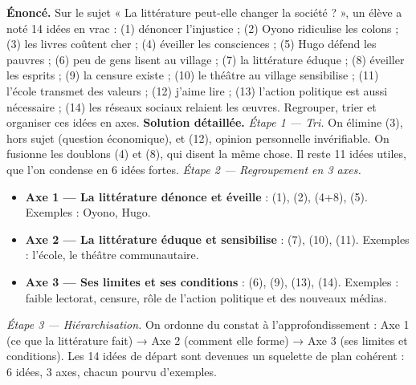 \documentclass[11pt]{article}
\begin{document}
\begin{exoresolu}
\textbf{Énoncé.} Sur le sujet « La littérature peut-elle changer la société ? », un élève a noté 14 idées en vrac : (1) dénoncer l'injustice ; (2) Oyono ridiculise les colons ; (3) les livres coûtent cher ; (4) éveiller les consciences ; (5) Hugo défend les pauvres ; (6) peu de gens lisent au village ; (7) la littérature éduque ; (8) éveiller les esprits ; (9) la censure existe ; (10) le théâtre au village sensibilise ; (11) l'école transmet des valeurs ; (12) j'aime lire ; (13) l'action politique est aussi nécessaire ; (14) les réseaux sociaux relaient les œuvres. Regrouper, trier et organiser ces idées en axes.
\tcblower
\textbf{Solution détaillée.}
\emph{Étape 1 — Tri.} On élimine (3), hors sujet (question économique), et (12), opinion personnelle invérifiable. On fusionne les doublons (4) et (8), qui disent la même chose. Il reste 11 idées utiles, que l'on condense en 6 idées fortes.
\emph{Étape 2 — Regroupement en 3 axes.}
\begin{itemize}
\item \textbf{Axe 1 — La littérature dénonce et éveille} : (1), (2), (4+8), (5). Exemples : Oyono, Hugo.
\item \textbf{Axe 2 — La littérature éduque et sensibilise} : (7), (10), (11). Exemples : l'école, le théâtre communautaire.
\item \textbf{Axe 3 — Ses limites et ses conditions} : (6), (9), (13), (14). Exemples : faible lectorat, censure, rôle de l'action politique et des nouveaux médias.
\end{itemize}
\emph{Étape 3 — Hiérarchisation.} On ordonne du constat à l'approfondissement : Axe 1 (ce que la littérature fait) → Axe 2 (comment elle forme) → Axe 3 (ses limites et conditions). Les 14 idées de départ sont devenues un squelette de plan cohérent : 6 idées, 3 axes, chacun pourvu d'exemples.
\end{exoresolu}
\end{document}

